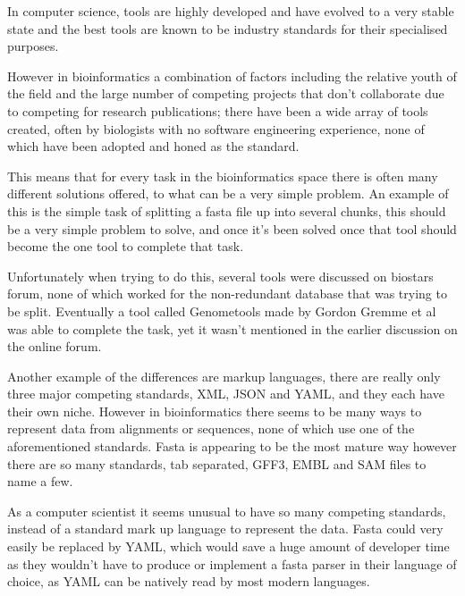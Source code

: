 In computer science, tools are highly developed and have evolved to a very stable state and the best tools are known to be industry standards for their specialised purposes. 

However in bioinformatics a combination of factors including the relative youth of the field and the large number of competing projects that don't collaborate due to competing for research publications; there have been a wide array of tools created, often by biologists with no software engineering experience, none of which have been adopted and honed as the  standard. 

This means that for every task in the bioinformatics space there is often many different solutions offered, to what can be a very simple problem. An example of this is the simple task of splitting a fasta file up into several chunks, this should be a very simple problem to solve, and once it's been solved once that tool should become the one tool to complete that task. 

Unfortunately when trying to do this, several tools were discussed on biostars forum\cite{biostars}, none of which worked for the non-redundant database that was trying to be split. Eventually a tool called Genometools made by Gordon Gremme et al\cite{genometools} was able to complete the task, yet it wasn't mentioned in the earlier discussion on the online forum. 

Another example of the differences are markup languages, there are really only three major competing standards, XML, JSON and YAML, and they each have their own niche. However in bioinformatics there seems to be many ways to represent data from alignments or sequences, none of which use one of the aforementioned standards. Fasta is appearing to be the most mature way however there are so many standards, tab separated, GFF3, EMBL and SAM files to name a few. 

As a computer scientist it seems unusual to have so many competing standards, instead of a standard mark up language to represent the data. Fasta could very easily be replaced by YAML, which would save a huge amount of developer time as they wouldn't have to produce or implement a fasta parser in their language of choice, as YAML can be natively read by most modern languages. 

%

